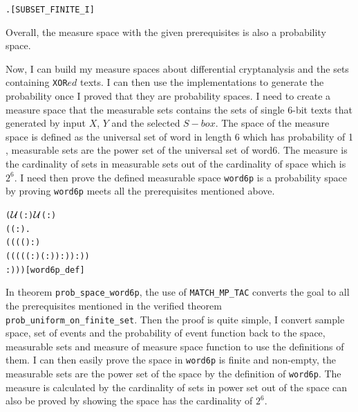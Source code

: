 \documentclass{article}
\begin{document}
\begin{alltt}
  \HOLTokenTurnstile{} \HOLSymConst{\HOLTokenForall{}} .   \HOLSymConst{\HOLTokenConj{}}  \HOLSymConst{\HOLTokenSubset{}}  \HOLSymConst{\HOLTokenImp{}}  \hfill{[SUBSET_FINITE_I]}
\end{alltt}

Overall, the measure space with the given prerequisites is also a probability space.

Now, I can build my measure spaces about differential cryptanalysis and the sets containing \verb|XOR|$ed$ texts. I can then use
the implementations to generate the probability once I proved that they are probability spaces. I need to create a measure space
that the measurable sets contains the sets of single 6-bit texts that generated by input $X$, $Y$ and the selected $S-box$.
The space of the measure space is defined as the universal set of word in length 6 which has probability of 1 ,
measurable sets are the power set of the universal set of word6. The measure is the cardinality of sets in measurable sets
out of the cardinality of space which is $2^6$. I need then prove the defined measurable space \verb|word6p| is
a probability space by proving \verb|word6p| meets all the prerequisites mentioned above.

\begin{alltt}
  \HOLTokenTurnstile{}  \HOLSymConst{=}
   (\ensuremath{{\cal{U}}}(:)\HOLSymConst{,} \ensuremath{{\cal{U}}}(:)\HOLSymConst{,}
    (\HOLTokenLambda{}( : \HOLTokenMap{} ).
         ((((\HOLSymConst{\&} ) :) \HOLSymConst{/}
           ((\HOLSymConst{\&}((( :) \HOLSymConst{\HOLTokenExp{}} ( :)) :)) :))
            :)))\hfill{[word6p_def]}
\end{alltt}

In theorem \verb|prob_space_word6p|, the use of \verb|MATCH_MP_TAC| converts the goal to all the prerequisites mentioned in the
verified theorem \verb|prob_uniform_on_finite_set|. Then the proof is quite simple, I convert sample space, set of events
and the probability of event function back to the space, measurable sets and measure of measure space function to use the
definitions of them. I can then easily prove the space in \verb|word6p| is finite and non-empty, the measurable sets are the power
set of the space by the definition of \verb|word6p|.  The measure is calculated by the cardinality of sets in power set
out of the space can also be proved by showing the space has the cardinality of $2^6$.
\end{document}
